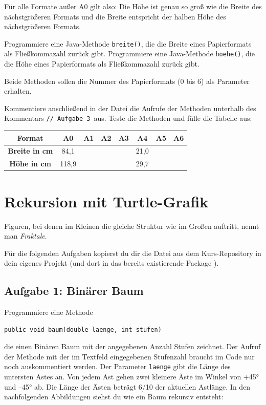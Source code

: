 Für alle Formate außer A0 gilt also: 
Die Höhe ist genau so groß wie die Breite des nächstgrößeren Formats und die
Breite entspricht der halben Höhe des nächstgrößeren Formats.

Programmiere eine Java-Methode \lstinline|breite()|, die die Breite eines
Papierformats als Fließkommazahl zurück gibt. Programmiere eine Java-Methode
\lstinline|hoehe()|, die die Höhe eines Papierformats als Fließkommazahl zurück
gibt.

Beide Methoden sollen die Nummer des Papierformats (0 bis 6) als Parameter
erhalten. 

Kommentiere anschließend in der Datei die Aufrufe der Methoden unterhalb des
Kommentars \glqq\lstinline|// Aufgabe 3|\grqq\ aus. Teste die Methoden und
fülle die Tabelle aus:

\bgroup
\def\arraystretch{1.2}
\begin{tabular}{|c|c|c|c|c|c|c|c|}\hline
\textbf{Format}       & \textbf{A0} & \textbf{A1} & \textbf{A2} & \textbf{A3} & \textbf{A4} & \textbf{A5} & \textbf{A6} \\ \hline
\textbf{Breite in cm} &  84,1 &  &  &  & 21,0 & & \\ \hline
\textbf{Höhe in cm}   & 118,9 &  &  &  & 29,7 & & \\ \hline
\end{tabular}
\egroup


\section{Rekursion mit Turtle-Grafik}

Figuren, bei denen im Kleinen die gleiche Struktur wie im Großen auftritt,
nennt man \emph{Fraktale}.

Für die folgenden Aufgaben kopierst du dir die Datei
 aus dem Kurs-Repository in dein eigenes Projekt (und
dort in das bereits existierende Package ).

\subsection{Aufgabe 1: Binärer Baum}

Programmiere eine Methode

\begin{lstlisting}
public void baum(double laenge, int stufen)
\end{lstlisting}

die einen Binären Baum mit der angegebenen Anzahl Stufen zeichnet. Der Aufruf
der Methode mit der im Textfeld eingegebenen Stufenzahl braucht im Code nur
noch auskommentiert werden. Der Parameter \lstinline|laenge| gibt die Länge des
untersten Astes an. Von jedem Ast gehen zwei kleinere Äste im Winkel von +45°
und –45° ab. Die Länge der Ästen beträgt 6/10 der aktuellen Astlänge. In den
nachfolgenden Abbildungen siehst du wie ein Baum rekursiv entsteht:

